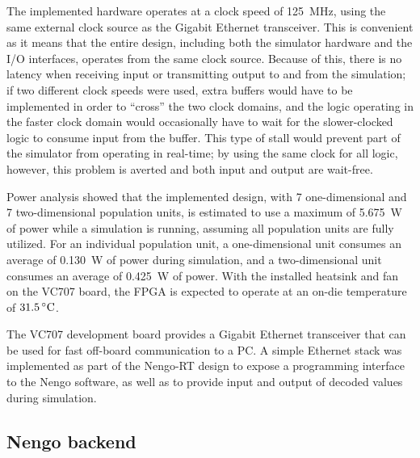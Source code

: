 \documentclass[english]{article}
\begin{document}
The implemented hardware operates at a clock speed of 125~MHz, using the same external clock source as the Gigabit Ethernet transceiver.
This is convenient as it means that the entire design, including both the simulator hardware and the I/O interfaces, operates from the same clock source.
Because of this, there is no latency when receiving input or transmitting output to and from the simulation;
if two different clock speeds were used, extra buffers would have to be implemented in order to ``cross'' the two clock domains,
and the logic operating in the faster clock domain would occasionally have to wait for the slower-clocked logic to consume input from the buffer.
This type of stall would prevent part of the simulator from operating in real-time; by using the same clock for all logic, however, this problem is averted and
both input and output are wait-free.

Power analysis showed that the implemented design, with 7 one-dimensional and 7 two-dimensional population units,
is estimated to use a maximum of 5.675~W of power while a simulation is running, assuming all population units are fully utilized.
For an individual population unit, a one-dimensional unit consumes an average of 0.130~W of power during simulation,
and a two-dimensional unit consumes an average of 0.425~W of power.
With the installed heatsink and fan on the VC707 board, the FPGA is expected to operate at an on-die temperature of $31.5\,^{\circ}{\rm C}$.

The VC707 development board provides a Gigabit Ethernet transceiver that can be used for fast off-board communication to a PC.
A simple Ethernet stack was implemented as part of the Nengo-RT design to expose a programming interface to the Nengo software,
as well as to provide input and output of decoded values during simulation.


\subsection{Nengo backend}
\end{document}
